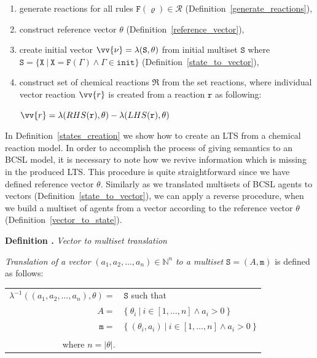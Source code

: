 \documentclass[12pt, twoside]{fithesis2} %
\newcounter{counter}[section]
\renewcommand{\thecounter}{\thesection.\arabic{counter}}
\newenvironment{definition}[1]{\bigskip\refstepcounter{counter}\noindent\textbf{Definition \thecounter } \emph{#1} \par\nopagebreak \begin{itshape}}{\end{itshape}\bigskip}
\begin{document}
\begin{enumerate}
\item generate reactions for all rules $\mathtt{F}(\varrho) \in \mathcal{R}$ (Definition~\ref{generate_reactions}),
\item construct reference vector $\theta$ (Definition~\ref{reference_vector}),
\item create initial vector $\vv{\nu} = \lambda(\mathtt{S}, \theta)$ from initial multiset $\mathtt{S}$ where $\mathtt{S} = \{ \mathtt{X} ~|~ \mathtt{X} = \mathtt{F}(\Gamma) \wedge \Gamma \in \mathtt{init} \}$ (Definition~\ref{state_to_vector}),
\item construct set of chemical reactions $\mathfrak{R}$ from the set reactions, where individual vector reaction $\vv{r}$ is created from a reaction $\mathtt{r}$ as following:

\begin{center}
$\vv{r} = \lambda(RHS(\mathtt{r}), \theta) - \lambda(LHS(\mathtt{r}), \theta)$
\end{center}

\end{enumerate}

In Definition~\ref{states_creation} we show how to create an LTS from a chemical reaction model. In order to accomplish the process of giving semantics to an BCSL model, it is necessary to note how we revive information which is missing in the produced LTS. This procedure is quite straightforward since we have defined reference vector $\theta$. Similarly as we translated multisets of BCSL agents to vectors (Definition~\ref{state_to_vector}), we can apply a reverse procedure, when we build a multiset of agents from a vector according to the reference vector $\theta$ (Definition~\ref{vector_to_state}).

\begin{definition}{Vector to multiset translation}
\label{vector_to_state}

\emph{Translation of a vector} $(a_1, a_2, \ldots, a_n) \in \mathbb{N}^n$ \emph{to a multiset} $\mathtt{S} = (A, \mathtt{m})$ is defined as follows:

\begin{center}
\begin{tabular}{r@{\hskip 0.08cm}l}
$\lambda^{-1}((a_1, a_2, \ldots, a_n), \theta) =$ & $ \mathtt{S}$ such that\\
$A = $ & $ \{~ \theta_i ~|~ i \in [1, \ldots, n] \wedge a_i > 0 ~\}$\\

$\mathtt{m} = $& $ \{~ (\theta_i, a_i) ~|~ i \in [1, \ldots, n] \wedge a_i > 0 ~\}$\\
& \\
where $n = |\theta|$. &\\
\end{tabular}
\end{center}
\end{definition}
\end{document}
